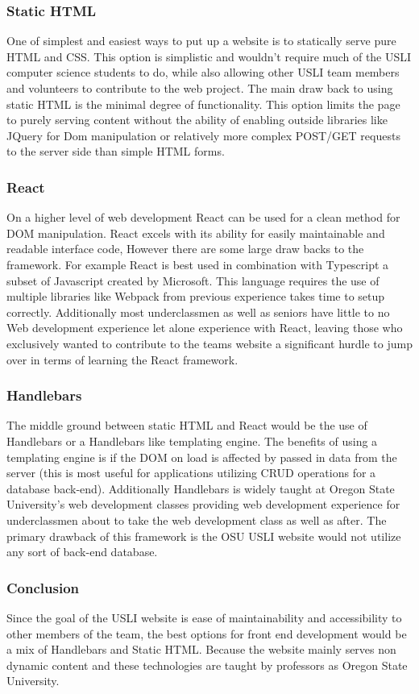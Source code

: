\documentclass[onecolumn, draftclsnofoot,10pt, compsoc]{IEEEtran}
\begin{document}
    \subsubsection{Static HTML}
    One of simplest and easiest ways to put up a website is to statically serve pure HTML and CSS. This option is simplistic and wouldn't require much of the USLI computer science students to do, while also allowing other USLI team members and volunteers to contribute to the web project. The main draw back to using static HTML is the minimal degree of functionality. This option limits the page to purely serving content without the ability of enabling outside libraries like JQuery for Dom manipulation or relatively more complex POST/GET requests to the server side than simple HTML forms. 
    \subsubsection{React}
    On a higher level of web development React can be used for a clean method for DOM manipulation. React excels with its ability for easily maintainable and readable interface code, However there are some large draw backs to the framework. For example React is best used in combination with Typescript a subset of Javascript created by Microsoft. This language requires the use of multiple libraries like Webpack from previous experience takes time to setup correctly. Additionally most underclassmen as well as seniors have little to no Web development experience let alone experience with React, leaving those who exclusively wanted to contribute to the teams website a significant hurdle to jump over in terms of learning the React framework.
    \subsubsection{Handlebars}
    The middle ground between static HTML and React would be the use of Handlebars or a Handlebars like templating engine. The benefits of using a templating engine is if the DOM on load is affected by passed in data from the server (this is most useful for applications utilizing CRUD operations for a database back-end). Additionally Handlebars is widely taught at Oregon State University's web development classes providing web development experience for underclassmen about to take the web development class as well as after. The primary drawback of this framework is the OSU USLI website would not utilize any sort of back-end database.
    \subsubsection{Conclusion}
    Since the goal of the USLI website is ease of maintainability and accessibility to other members of the team, the best options for front end development would be a mix of Handlebars and Static HTML. Because the website mainly serves non dynamic content and these technologies are taught by professors as Oregon State University.
    
\end{document}

